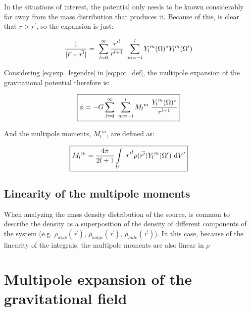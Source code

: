 In the situations of interest, the potential only needs to be known considerably far away from the mass distribution that produces it. Because of this, is clear that $r>r^\prime$, so the expansion is just:

\begin{equation}\label{eq:exp_legendre}
    \frac{1}{|\vec{r}-\vec{r^\prime}|} = \ 
    \sum\displaylimits_{l=0}^{\infty} \frac{{r^\prime}^l}{{r}^{l+1}} \ 
    \sum\displaylimits_{m=-l}^{l} {Y_l}^m(\Omega)^*{Y_l}^m(\Omega^\prime)
\end{equation}

Considering \ref{eq:exp_legendre} in \ref{eq:pot_def}, the multipole expansion of the gravitational potential therefore is:

\begin{equation}\label{eq:pot_multipole}
    \boxed{\phi = - G \sum\displaylimits_{l=0}^{\infty} \ 
    \sum\displaylimits_{m=-l}^{l} {M_l}^m \ 
    \frac{{Y_l}^m(\Omega)^*}{r^{l+1}}}
\end{equation}

And the multipole moments, ${M_{l}}^{m}$, are defined as:

\begin{equation}\label{eq:multipole_moments}
    \boxed{{M_l}^{m} = \frac{4\pi}{2l+1}\int\displaylimits_{U} \ 
    {r^\prime}^l \rho(\vec{{r^\prime}}) {Y_l}^m(\Omega^\prime) \ 
    \mathrm{d}V^\prime}
\end{equation}

\subsection{Linearity of the multipole moments}

When analyzing the mass density distribution of the source, is common to describe the density as a superposition of the density of different components of the system (e.g. $\rho_{disk}(\vec{r})$, $\rho_{bulge}(\vec{r})$, $\rho_{halo}(\vec{r})$). In this case, because of the linearity of the integrals, the multipole moments are also linear in $\rho$

\section{Multipole expansion of the gravitational field}




